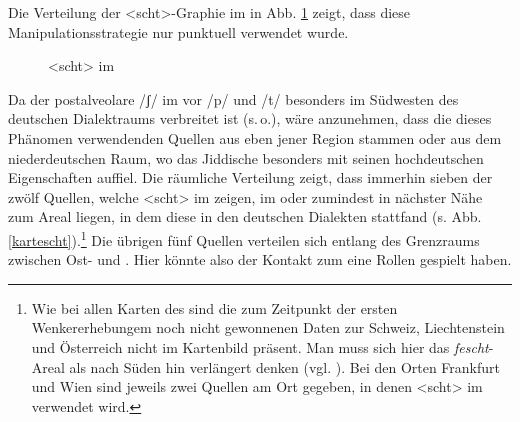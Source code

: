 Die Verteilung der <scht>-Graphie im  in Abb. \ref{<scht>} zeigt, dass diese Manipulationsstrategie nur punktuell verwendet wurde.\\

\begin{figure}[h!]
	\caption{<scht> im }
	\label{<scht>}	
\end{figure}
\FloatBarrier


Da der postalveolare  /ʃ/ im  vor /p/ und /t/ besonders im Südwesten des deutschen Dialektraums verbreitet ist (s.\,o.), wäre anzunehmen, dass die dieses Phänomen verwendenden Quellen aus eben jener Region stammen oder aus dem niederdeutschen Raum, wo das Jiddische besonders mit seinen hochdeutschen Eigenschaften auffiel. Die räumliche Verteilung zeigt, dass immerhin sieben der zwölf Quellen, welche <scht> im  zeigen, im oder zumindest in nächster Nähe zum Areal liegen, in dem diese  in den deutschen Dialekten stattfand (s. Abb. \ref{kartescht}).\footnote{Wie bei allen Karten des  sind die zum  Zeitpunkt der ersten Wenkererhebungem noch nicht gewonnenen Daten zur Schweiz, Liechtenstein und Österreich nicht im Kartenbild präsent. Man muss sich hier das \textit{fescht}-Areal als nach Süden hin verlängert denken (vgl. \cite[361]{Schirmunski1962}). Bei den Orten Frankfurt und Wien sind jeweils zwei Quellen am Ort gegeben, in denen <scht> im  verwendet wird.} Die übrigen fünf Quellen verteilen sich entlang des Grenzraums zwischen Ost- und . Hier könnte also der Kontakt zum  eine Rollen gespielt haben. \\


